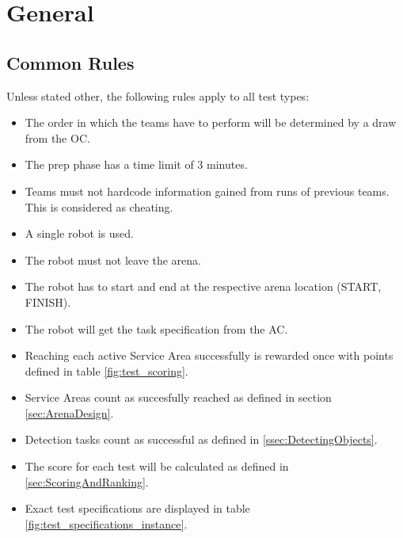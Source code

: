 \label{sec:Tests}

\section{General}

\subsection{Common Rules}
\label{ssec: Common Rules}

Unless stated other, the following rules apply to all test types:

\begin{itemize}
\item The order in which the teams have to perform will be determined by a draw from the OC.
\item The prep phase has a time limit of 3 minutes.
\item Teams must not hardcode information gained from runs of previous teams. This is considered as cheating.
\item A single robot is used.
\item The robot must not leave the arena.
\item The robot has to start and end at the respective arena location (START, FINISH).
\item The robot will get the task specification from the AC.
\item Reaching each active Service Area successfully is rewarded once with points defined in table \ref{fig:test_scoring}.
\item Service Areas count as succesfully reached as defined in section \ref{sec:ArenaDesign}.
\item Detection tasks count as successful as defined in \ref{ssec:DetectingObjects}.
\item The score for each test will be calculated as defined in \ref{sec:ScoringAndRanking}.
\item Exact test specifications are displayed in table \ref{fig:test_specifications_instance}.
\end{itemize}

\newpage











